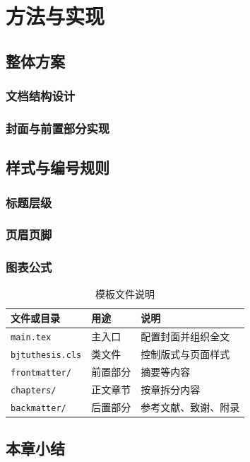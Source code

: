 \chapter{方法与实现}

\section{整体方案}
\placeholderpar

\subsection{文档结构设计}
\placeholderpar

\subsection{封面与前置部分实现}
\placeholderpar

\section{样式与编号规则}
\placeholderpar

\subsection{标题层级}
\placeholderpar

\subsection{页眉页脚}
\placeholderpar

\subsection{图表公式}
\placeholderpar

\begin{table}[htbp]
  \centering
  \caption{模板文件说明}
  \begin{tabular}{lll}
    \toprule
    文件或目录 & 用途 & 说明 \\
    \midrule
    \texttt{main.tex} & 主入口 & 配置封面并组织全文 \\
    \texttt{bjtuthesis.cls} & 类文件 & 控制版式与页面样式 \\
    \texttt{frontmatter/} & 前置部分 & 摘要等内容 \\
    \texttt{chapters/} & 正文章节 & 按章拆分内容 \\
    \texttt{backmatter/} & 后置部分 & 参考文献、致谢、附录 \\
    \bottomrule
  \end{tabular}
\end{table}

\section{本章小结}
\placeholderpar
